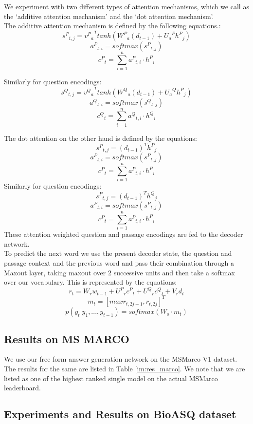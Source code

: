 We experiment with two different types of attention mechanisms, which we call as the `additive attention mechanism' and the `dot attention mechanism'. \\
The additive attention mechanism is defined by the following equations.:\\
\[  {{s^P}_{t,j}} = {{v^P}_a}^Ttanh({W^P}_a(d_{t-1}) + {U_a}^P{h^P}_j )\]
\[{a^P}_{t,i} = softmax({{s^P}_{t,j}})\]
\[{c^P}_t = \sum_{i=1}^n {a^P}_{t,i} \cdot {h^P}_i\]

Similarly for question encodings:\\
\[  {{s^Q}_{t,j}} = {{v^Q}_a}^Ttanh({W^Q}_a(d_{t-1}) + {U_a}^Q{h^P}_j )\]
\[{a^Q}_{t,i} = softmax({{s^Q}_{t,j}})\]
\[{c^Q}_t = \sum_{i=1}^n {a^Q}_{t,i} \cdot {h^Q}_i\]

The dot attention on the other hand is defined by the equations:\\
\[  {{s^P}_{t,j}} = (d_{t-1})^T{h^P}_j \]
\[{a^P}_{t,i} = softmax({{s^P}_{t,j}})\]
\[{c^P}_t = \sum_{i=1}^n {a^P}_{t,i} \cdot {h^P}_i\]
Similarly for question encodings:\\
\[  {{s^P}_{t,j}} = (d_{t-1})^T{h^Q}_j \]
\[{a^P}_{t,i} = softmax({{s^P}_{t,j}})\]
\[{c^P}_t = \sum_{i=1}^n {a^P}_{t,i} \cdot {h^P}_i\]
These attention weighted question and passage encodings are fed to the decoder network.\\
To predict the next word we use the present decoder state, the question and passage context and the previous word and pass their combination through a Maxout layer, taking maxout over 2 successive units and then take a softmax over our vocabulary. This is represented by the equations:\\
\[r_t = W_rw_{t-1} + {U^P}_r{c^P}_t + {U^Q}_r{c^Q}_t + V_rd_t \]
\[m_t = [max{r_{t,2j-1}, r_{t,2j}}]^T \]
\[p(y_t|y_1, . . . , y_{t-1}) = softmax(W_o \cdot m_t) \]


\subsection{Results on MS MARCO}
We use our free form answer generation network on the MSMarco V1 dataset. The results for the same are listed in Table \ref{im:res_marco}. We note that we are listed as one of the highest ranked single model on the actual MSMarco leaderboard.

\subsection{Experiments and Results on BioASQ dataset}

